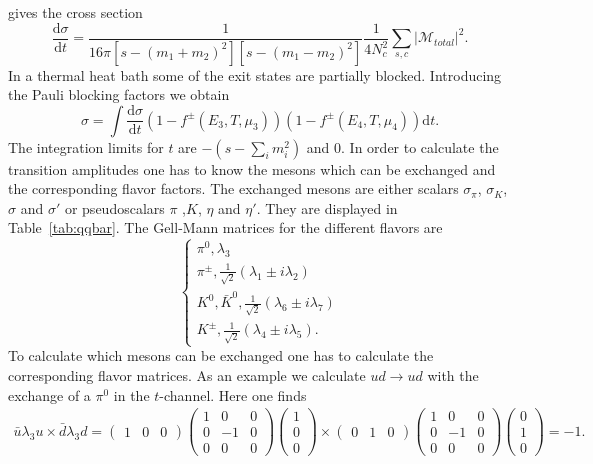 \documentclass[a4paper]{jpconf}
\begin{document}
 gives the cross section
\begin{equation}
\frac{\mathrm{d}\sigma}{\mathrm{d}t} = \frac{1}{16 \pi [s-(m_1+m_2)^2][s-(m_1-m_2)^2]}\frac{1}{4N_c^2} \sum_{s,c} |\mathcal{M}_{total}|^2.
\end{equation} 
In a thermal heat bath some of the exit states are partially blocked. Introducing the Pauli blocking factors we obtain
\begin{equation}
\sigma = \int \frac{\mathrm{d}\sigma}{\mathrm{d}t} (1-f^{\pm}(E_3,T,\mu_3))(1-f^{\pm}(E_4,T,\mu_4)) \mathrm{d}t .
\end{equation}
The integration limits for
 $t$ are $-(s- \sum_{i} m_i^2)$ and  0.
In order to calculate the transition amplitudes one has to know the mesons which can be exchanged and the corresponding flavor factors.
The exchanged mesons are either scalars $\sigma_\pi$, $\sigma_K$, $\sigma$ and $\sigma'$ or pseudoscalars  $\pi$ ,$K$, $\eta$ and $\eta'$. They are displayed in Table~\ref{tab:qqbar}.
The Gell-Mann matrices for the different flavors are  
\begin{equation}
\begin{cases}
\pi^0, \lambda_3 \\
\pi^\pm, \frac{1}{\sqrt{2}}(\lambda_1 \pm i \lambda_2) \\
K^0,\bar{K}^0, \frac{1}{\sqrt{2}}(\lambda_6 \pm i \lambda_7) \\
K^\pm,\frac{1}{\sqrt{2}}(\lambda_4 \pm i \lambda_5).
\end{cases} 
\end{equation}
To calculate which mesons can be exchanged one has to calculate the corresponding flavor matrices. As an example we calculate $ud \rightarrow ud$ with the exchange of a $\pi^{0}$ in the $t$-channel. Here one finds
\begin{equation} 
\begin{split}
\bar{u} \lambda_3 u \times \bar{d} \lambda_3 d= 
\begin{pmatrix} 1 & 0  & 0 \end{pmatrix} \begin{pmatrix} 1 & 0 & 0 \\ 0 & -1 & 0 \\ 0 & 0 & 0 \end{pmatrix} \begin{pmatrix} 1 \\ 0\\ 0 \end{pmatrix} \times
\begin{pmatrix} 0 & 1  & 0 \end{pmatrix} \begin{pmatrix} 1 & 0 & 0 \\ 0 & -1 & 0 \\ 0 & 0 & 0 \end{pmatrix} \begin{pmatrix} 0 \\ 1\\ 0 \end{pmatrix} = -1.
\end{split}
\end{equation}
\end{document}
